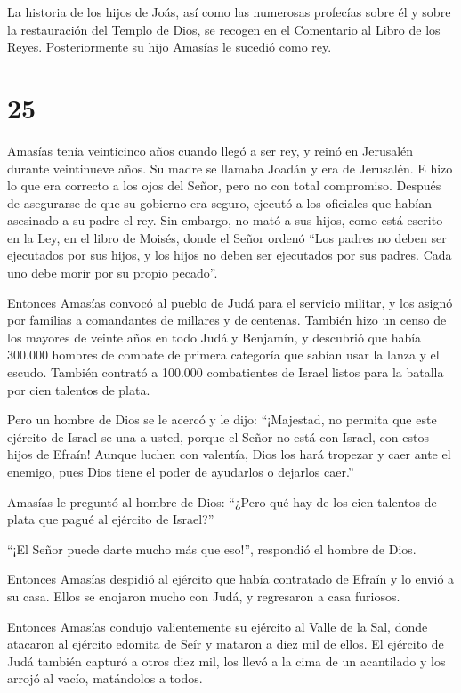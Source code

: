  La historia de los hijos de Joás, así como las numerosas
profecías sobre él y sobre la restauración del Templo de Dios, se
recogen en el Comentario al Libro de los Reyes. Posteriormente su hijo
Amasías le sucedió como rey.

\hypertarget{section-24}{%
\section{25}\label{section-24}}

 Amasías tenía veinticinco años cuando llegó a ser rey, y
reinó en Jerusalén durante veintinueve años. Su madre se llamaba Joadán
y era de Jerusalén.  E hizo lo que era correcto a los ojos
del Señor, pero no con total compromiso.  Después de
asegurarse de que su gobierno era seguro, ejecutó a los oficiales que
habían asesinado a su padre el rey.  Sin embargo, no mató a
sus hijos, como está escrito en la Ley, en el libro de Moisés, donde el
Señor ordenó ``Los padres no deben ser ejecutados por sus hijos, y los
hijos no deben ser ejecutados por sus padres. Cada uno debe morir por su
propio pecado''.

 Entonces Amasías convocó al pueblo de Judá para el servicio
militar, y los asignó por familias a comandantes de millares y de
centenas. También hizo un censo de los mayores de veinte años en todo
Judá y Benjamín, y descubrió que había 300.000 hombres de combate de
primera categoría que sabían usar la lanza y el escudo. 
También contrató a 100.000 combatientes de Israel listos para la batalla
por cien talentos de plata.

 Pero un hombre de Dios se le acercó y le dijo: ``¡Majestad,
no permita que este ejército de Israel se una a usted, porque el Señor
no está con Israel, con estos hijos de Efraín!  Aunque
luchen con valentía, Dios los hará tropezar y caer ante el enemigo, pues
Dios tiene el poder de ayudarlos o dejarlos caer.''

 Amasías le preguntó al hombre de Dios: ``¿Pero qué hay de
los cien talentos de plata que pagué al ejército de Israel?''

``¡El Señor puede darte mucho más que eso!'', respondió el hombre de
Dios.

 Entonces Amasías despidió al ejército que había contratado
de Efraín y lo envió a su casa. Ellos se enojaron mucho con Judá, y
regresaron a casa furiosos.

 Entonces Amasías condujo valientemente su ejército al
Valle de la Sal, donde atacaron al ejército edomita de Seír y mataron a
diez mil de ellos.  El ejército de Judá también capturó a
otros diez mil, los llevó a la cima de un acantilado y los arrojó al
vacío, matándolos a todos.

